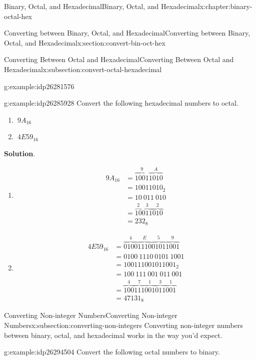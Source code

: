 \documentclass[twoside,10pt,]{book}
\newcommand{\blocktitlefont}{\relax}
\numberwithin{equation}{section}
\newcommand{\amp}{&}
\begin{document}
\begin{chapterptx}{Binary, Octal, and Hexadecimal}{}{Binary, Octal, and Hexadecimal}{}{}{x:chapter:binary-octal-hex}
\begin{sectionptx}{Converting between Binary, Octal, and Hexadecimal}{}{Converting between Binary, Octal, and Hexadecimal}{}{}{x:section:convert-bin-oct-hex}
\begin{subsectionptx}{Converting Between Octal and Hexadecimal}{}{Converting Between Octal and Hexadecimal}{}{}{x:subsection:convert-octal-hexadecimal}
\begin{example}{}{g:example:idp26281576}
\begin{enumerate}
%
\end{enumerate}
\end{example}
\begin{example}{}{g:example:idp26285928}%
Convert the following hexadecimal numbers to octal. %
\begin{enumerate}
\item{}\(\displaystyle \ 9A_{16}\)%
\item{}\(\displaystyle \ 4E59_{16}\)%
\end{enumerate}
\par\smallskip%
\noindent\textbf{\blocktitlefont Solution}.\label{g:solution:idp26289512}{}\hypertarget{g:solution:idp26289512}{}\quad{}%
\begin{enumerate}
\item{}%
\begin{align*}
9A_{16} \amp = \overbrace{1001}^9\overbrace{1010}^A\\
\amp = 10011010_2\\
\amp = 10\ 011\ 010\\
\amp = \overbrace{10}^2\overbrace{011}^3\overbrace{010}^2\\
\amp = 232_8
\end{align*}
%
\item{}%
\begin{align*}
4E59_{16} \amp = \overbrace{0100}^4\overbrace{1110}^E\overbrace{0101}^5\overbrace{1001}^9\\
\amp = 0100\ 1110\ 0101\ 1001\\
\amp = 100111001011001_2\\
\amp = 100\ 111\ 001\ 011\ 001\\
\amp = \overbrace{100}^4\overbrace{111}^7\overbrace{001}^1\overbrace{011}^3\overbrace{001}^1\\
\amp = 47131_8
\end{align*}
%
\end{enumerate}
\end{example}
\end{subsectionptx}
%
%
\typeout{************************************************}
\typeout{************************************************}
%
\begin{subsectionptx}{Converting Non-integer Numbers}{}{Converting Non-integer Numbers}{}{}{x:subsection:converting-non-integers}
Converting non-integer numbers between binary, octal, and hexadecimal works in the way you'd expect.%
\begin{example}{}{g:example:idp26294504}%
Convert the following octal numbers to binary. %

\end{example}
\end{subsectionptx}
\end{sectionptx}
\end{chapterptx}
\end{document}
